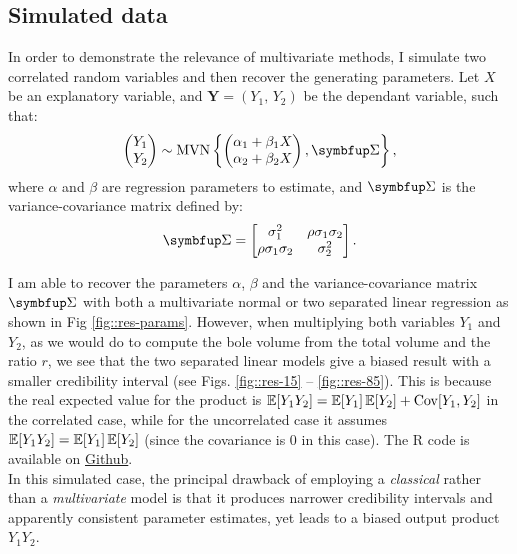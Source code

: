 \subsection{Simulated data}
In order to demonstrate the relevance of multivariate methods, I simulate two correlated random variables and then recover the generating parameters. Let \( X \) be an explanatory variable, and \( \mathbf{Y} = (Y_1, \, Y_2) \) be the dependant variable, such that:
\[
	\begin{pmatrix}
		Y_1 \\
		Y_2
	\end{pmatrix} \sim
	\MVN\left\{ \begin{pmatrix}
		\alpha_1 + \beta_1 X \\
		\alpha_2 + \beta_2 X \\
	\end{pmatrix}, \Sigmabf \right\},
\]
where \( \alpha \) and \( \beta \) are regression parameters to estimate, and \( \Sigmabf \) is the variance-covariance matrix defined by:
\[
	\Sigmabf = \begin{bmatrix}
		\sigma_1^2 & \rho \sigma_1 \sigma_2 \\
		\rho \sigma_1 \sigma_2 & \sigma_2^2
	\end{bmatrix}. \\
\]

I am able to recover the parameters \( \alpha \), \( \beta \) and the variance-covariance matrix \( \Sigmabf \) with both a multivariate normal or two separated linear regression as shown in Fig \ref{fig::res-params}. However, when multiplying both variables \( Y_1 \) and \( Y_2 \), as we would do to compute the bole volume from the total volume and the ratio \( r \), we see that the two separated linear models give a biased result with a smaller credibility interval (see Figs. \ref{fig::res-15} -- \ref{fig::res-85}). This is because the real expected value for the product is \( \operatorname{\mathbb{E}}[Y_1 Y_2] = \operatorname{\mathbb{E}}[Y_1] \operatorname{\mathbb{E}}[Y_2] + \operatorname{Cov}[Y_1, Y_2] \) in the correlated case, while for the uncorrelated case it assumes \( \operatorname{\mathbb{E}}[Y_1 Y_2] = \operatorname{\mathbb{E}}[Y_1] \operatorname{\mathbb{E}}[Y_2] \) (since the covariance is \num{0} in this case). The R code is available on \href{https://github.com/amael-ls/emerge/tree/main/communications/cst/2025-10-30/code}{ Github}. \\

In this simulated case, the principal drawback of employing a \textit{classical} rather than a \textit{multivariate} model is that it produces narrower credibility intervals and apparently consistent parameter estimates, yet leads to a biased output product \( Y_1 Y_2\).

